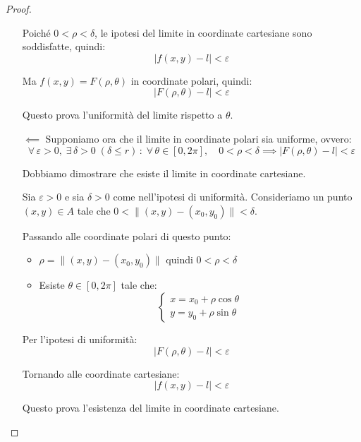 \documentclass{article}
\theoremstyle{plain}
\theoremstyle{definition}
\theoremstyle{remark}
\begin{document}
\begin{proof}
\begin{itemize}
        Poiché $0<\rho<\delta$, le ipotesi del limite in coordinate cartesiane sono soddisfatte, quindi:
        \[|f(x,y)-l|<\varepsilon\]
        
        Ma $f(x,y)=F(\rho,\theta)$ in coordinate polari, quindi:
        \[|F(\rho,\theta)-l|<\varepsilon\]
        
        Questo prova l'uniformità del limite rispetto a $\theta$.

        \item[$\impliedby$] Supponiamo ora che il limite in coordinate polari sia uniforme, ovvero:
        \[\forall\,\varepsilon>0,\;\exists\,\delta>0\;(\delta\leq r)\,:\;\forall\,\theta\in[0,2\pi],\quad 0<\rho<\delta\implies|F(\rho,\theta)-l|<\varepsilon\]
        
        Dobbiamo dimostrare che esiste il limite in coordinate cartesiane.
        
        Sia $\varepsilon>0$ e sia $\delta>0$ come nell'ipotesi di uniformità. Consideriamo un punto $(x,y)\in A$ tale che $0<\|(x,y)-(x_0,y_0)\|<\delta$.
        
        Passando alle coordinate polari di questo punto:
        \begin{itemize}
            \item $\rho=\|(x,y)-(x_0,y_0)\|$ quindi $0<\rho<\delta$
            \item Esiste $\theta\in[0,2\pi]$ tale che:
            \[\begin{cases}
                x=x_0+\rho\cos\theta\\
                y=y_0+\rho\sin\theta
            \end{cases}\]
        \end{itemize}
        
        Per l'ipotesi di uniformità:
        \[|F(\rho,\theta)-l|<\varepsilon\]
        
        Tornando alle coordinate cartesiane:
        \[|f(x,y)-l|<\varepsilon\]
        
        Questo prova l'esistenza del limite in coordinate cartesiane.
    \end{itemize}
\end{proof}

\vspace{10pt}
\end{document}
